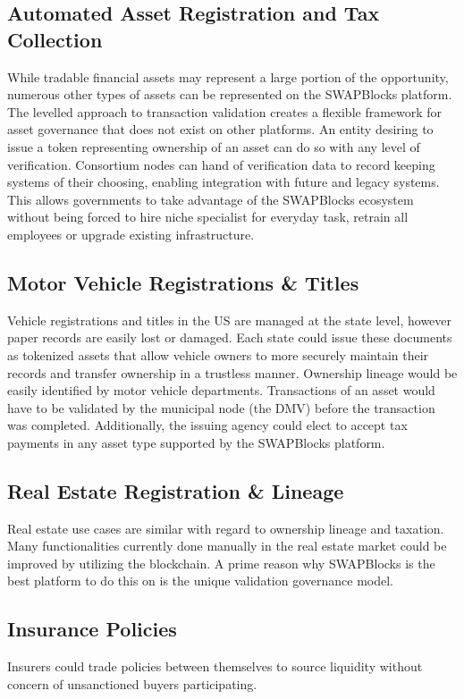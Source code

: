 \documentclass[12pt]{article}
\begin{document}
\subsection{Automated Asset Registration and Tax Collection}

While tradable financial assets may represent a large portion of the opportunity, numerous other types of assets can be represented on the SWAPBlocks platform. The levelled approach to transaction validation creates a flexible framework for asset governance that does not exist on other platforms. An entity desiring to issue a token representing ownership of an asset can do so with any level of verification. Consortium nodes can hand of verification data to record keeping systems of their choosing, enabling integration with future and legacy systems.  This allows governments to take advantage of the SWAPBlocks ecosystem without being forced to hire niche specialist for everyday task, retrain all employees or upgrade existing infrastructure.

\subsection{Motor Vehicle Registrations \& Titles}
Vehicle registrations and titles in the US are managed at the state level, however paper records are easily lost or damaged. Each state could issue these documents as tokenized assets that allow vehicle owners to more securely maintain their records and transfer ownership in a trustless manner. Ownership lineage would be easily identified by motor vehicle departments. Transactions of an asset would have to be validated by the municipal node (the DMV) before the transaction was completed. Additionally, the issuing agency could elect to accept tax payments in any asset type supported by the SWAPBlocks platform.

\subsection{Real Estate Registration \& Lineage}
Real estate use cases are similar with regard to ownership lineage and taxation. Many functionalities currently done manually in the real estate market could be improved by utilizing the blockchain. A prime reason why SWAPBlocks is the best platform to do this on is the unique validation governance model.

\subsection{Insurance Policies}
Insurers could trade policies between themselves to source liquidity without concern of unsanctioned buyers participating.
\end{document}
